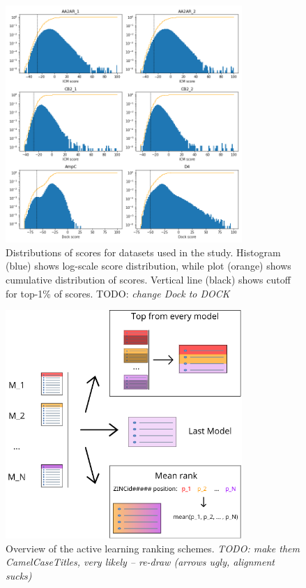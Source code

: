 \begin{figure}[h]
\centering
\includegraphics[width=0.8\textwidth]{figures/scores_distribution_v2.png}
\caption{Distributions of scores for datasets used in the study. Histogram (blue) shows log-scale score distribution, while plot (orange) shows cumulative distribution of scores. Vertical line (black) shows cutoff for top-1\% of scores. TODO: \textit{change Dock to DOCK}}
\label{fig:fig_1}
\end{figure}


\begin{figure}[h]
\centering
\includegraphics[width=0.8\textwidth]{figures/Figure_N_iteration_methods.png}
\caption{Overview of the active learning ranking schemes. \textit{TODO: make them CamelCaseTitles, very likely -- re-draw (arrows ugly, alignment sucks)}}
\label{fig:fig_2_scheme}
\end{figure}



